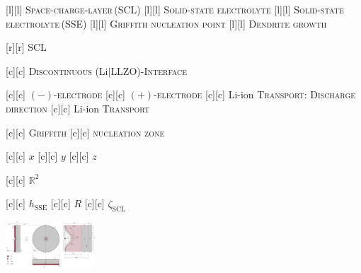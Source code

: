[l][l] {\scriptsize \textsc{Space-charge-layer\,(SCL)}}
[l][l]  {\scriptsize \textsc{Solid-state electrolyte}}
[l][l]  {\scriptsize \textsc{Solid-state electrolyte\,(SSE)}}
[l][l] {\scriptsize \textsc{Griffith nucleation point}}
[l][l] {\scriptsize \textsc{Dendrite growth}}

[r][r]  {\tiny \textsc{SCL}}

[c][c] {\scriptsize \textsc{Discontinuous} (Li$|$LLZO)-\textsc{Interface}}

[c][c] {\scriptsize $(-)$-\textsc{electrode}}
[c][c] {\scriptsize $(+)$-\textsc{electrode}}
[c][c] {\scriptsize Li-ion \textsc{Transport}: \textsc{Discharge direction}}
[c][c] {\scriptsize Li-ion \textsc{Transport}}

[c][c]   {\textsc{Griffith}}
[c][c] {\textsc{nucleation zone}}

[c][c] {\scriptsize $x$}
[c][c] {\scriptsize $y$}
[c][c] {\scriptsize $z$}

[c][c] {\scriptsize $\mathbb{R}^{2}$}

[c][c]  {\scriptsize $h_{\text{SSE}}$}
[c][c] {\scriptsize $R$}
[c][c] {\scriptsize $\zeta_{\text{SCL}}$}

\includegraphics[width=0.25\textwidth]{space_charge_layer_merged.eps}